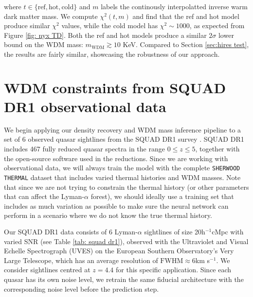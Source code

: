where $t\in \{\mathrm{ref}, \mathrm{hot}, \mathrm{cold} \}$ and $m$ labels the continously interpolatted inverse warm dark matter mass. We compute $\chi^2(t,m)$ and find that the ref and hot model produce similar $\chi^2$ values, while the cold model has $\chi^2 \sim 1000$, as expected from Figure \ref{fig: nyx TD}. Both the ref and hot models produce a similar $2\sigma$ lower bound on the WDM mass: $m_{\mathrm{WDM}} \gtrsim 10$ KeV. Compared to Section \ref{sec:hires test}, the results are fairly similar, showcasing the robustness of our approach.
































\section{WDM constraints from SQUAD DR1 observational data}\label{sec:inference squad}
We begin applying our density recovery and WDM mass inference pipeline to a set of 6 observed quasar sightlines from the SQUAD DR1 survey \cite{Murphy_2018}. SQUAD DR1 includes 467 fully reduced quasar spectra in the range $0\leq z \leq 5$, together with the open-source software used in the reductions. Since we are working with observational data, we will always train the model with the complete \texttt{SHERWOOD THERMAL} dataset that includes varied thermal histories and WDM masses. Note that since we are not trying to constrain the thermal history (or other parameters that can affect the Lyman-$\alpha$ forest), we should ideally use a training set that includes as much variation as possible to make sure the neural network can perform in a scenario where we do not know the true thermal history.

Our SQUAD DR1  data consists of 6 Lyman-$\alpha$ sightlines of size 20h$^{-1}$cMpc with varied SNR (see Table \ref{tab: squad dr1}), observed with the Ultraviolet and Visual Echelle Spectrograph (UVES) on the European Southern Observatory’s Very Large Telescope, which has an average resolution of $\mathrm{FWHM}\approx 6$km s$^{-1}$. We consider sightlines centred at $z=4.4$ for this specific application. Since each quasar has its own noise level, we retrain the same fiducial architecture with the corresponding noise level before the prediction step.


